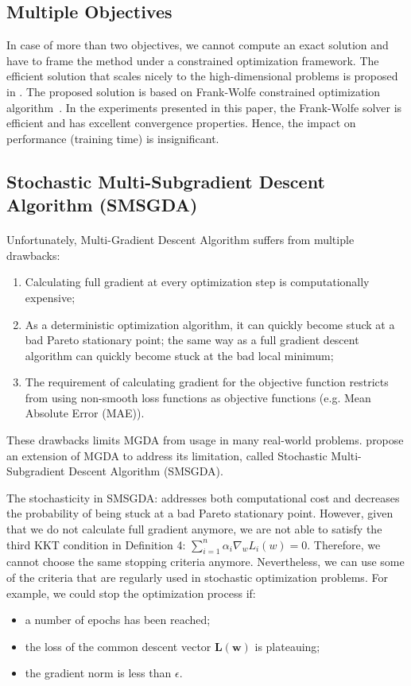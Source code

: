\documentclass[letterpaper]{article}
\begin{document}
\subsection{Multiple Objectives}

In case of more than two objectives, we cannot compute an exact solution and have to frame the method under a constrained optimization framework. The efficient solution that scales nicely to the high-dimensional problems is proposed in \cite{NIPS2018_7334}. The proposed solution is based on Frank-Wolfe constrained optimization algorithm~\cite{frank1956algorithm}. In the experiments presented in this paper, the Frank-Wolfe solver is efficient and has excellent convergence properties. Hence, the impact on performance (training time) is insignificant.

\subsection{Stochastic Multi-Subgradient Descent Algorithm (SMSGDA)}
\paragraph{}

Unfortunately, Multi-Gradient Descent Algorithm suffers from multiple drawbacks:
\begin{enumerate}
    \item Calculating full gradient at every optimization step is computationally expensive;
    \item As a deterministic optimization algorithm, it can quickly become stuck at a bad Pareto stationary point; the same way as a full gradient descent algorithm can quickly become stuck at the bad local minimum;
    \item The requirement of calculating gradient for the objective function restricts from using non-smooth loss functions as objective functions (e.g. Mean Absolute Error (MAE)).
\end{enumerate}

These drawbacks limits MGDA from usage in many real-world problems. \cite{poirion:hal-01660788} propose an extension of MGDA to address its limitation, called Stochastic Multi-Subgradient Descent Algorithm (SMSGDA).

The stochasticity in SMSGDA: addresses both computational cost and decreases the probability of being stuck at a bad Pareto stationary point. However, given that we do not calculate full gradient anymore, we are not able to satisfy the third KKT condition in Definition 4: $\sum_{i=1}^{n} \alpha_{i} \nabla_{w} L_{i}(w)=0$. Therefore, we cannot choose the same stopping criteria anymore. Nevertheless, we can use some of the criteria that are regularly used in stochastic optimization problems. For example, we could stop the optimization process if:
\begin{itemize}
    \item a number of epochs has been reached;
    \item the loss of the common descent vector $\mathbf{L(w)}$ is plateauing;
    \item the gradient norm is less than $\epsilon$.
\end{itemize}
\end{document}
